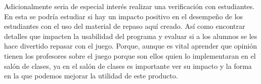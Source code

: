 Adicionalmente seria de especial interés realizar una verificación con estudiantes. En esta se podría estudiar si hay un impacto positivo en el desempeño de los estudiantes con el uso del material de repaso aquí creado. Así como encontrar detalles que impacten la usabilidad del programa y evaluar si a los alumnos se les hace divertido repasar con el juego. Porque, aunque es vital aprender que opinión tienen los profesores sobre el juego porque son ellos quien lo implementaran en el salón de clases, ya en el salón de clases es importante ver su impacto y la forma en la que podemos mejorar la utilidad de este producto.



